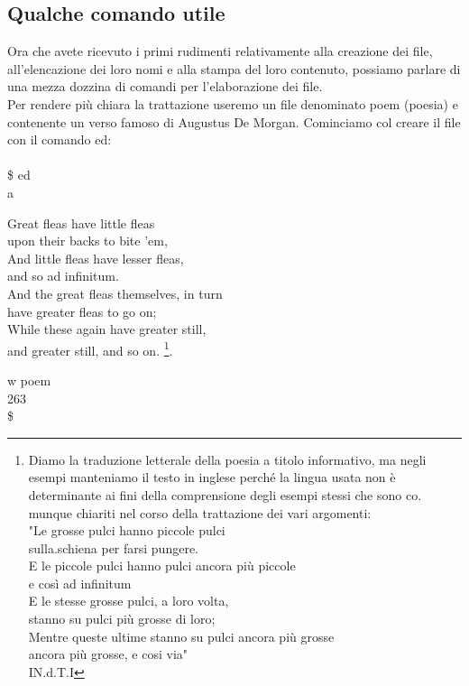 \subsection{Qualche comando utile}
Ora che avete ricevuto i primi rudimenti relativamente alla creazione dei file, all'elencazione 
dei loro nomi e alla stampa del loro contenuto, possiamo parlare di una mezza dozzina 
di comandi per l'elaborazione dei file.\\
Per rendere più chiara la trattazione useremo un file denominato poem (poesia) e contenente
un verso famoso di Augustus De Morgan.
Cominciamo col creare il file con il comando ed:\\\\
\$ ed\\
a
\begin{center}
	Great fleas have little fleas\\
	upon their backs to bite 'em,\\
	And little fleas have lesser fleas,\\
	and so ad infinitum.\\
	And the great fleas themselves, in turn\\
	have greater fleas to go on;\\
	While these again have greater still,\\
	and greater still, and so on. \footnote{Diamo la traduzione letterale della poesia a titolo informativo, ma negli esempi manteniamo il testo in
		inglese perché la lingua usata non è determinante ai fini della comprensione degli esempi stessi che sono co.
		munque chiariti nel corso della trattazione dei vari argomenti:\\
		"Le grosse pulci hanno piccole pulci\\
		sulla.schiena per farsi pungere.\\
		E le piccole pulci hanno pulci ancora più piccole\\
		e così ad infinitum\\
		E le stesse grosse pulci, a loro volta,\\
		stanno su pulci più grosse di loro;\\
		Mentre queste ultime stanno su pulci ancora più grosse\\
		ancora più grosse, e cosi via"\\
		IN.d.T.I}.\\
\end{center}
w poem\\
263\\
\$\\

